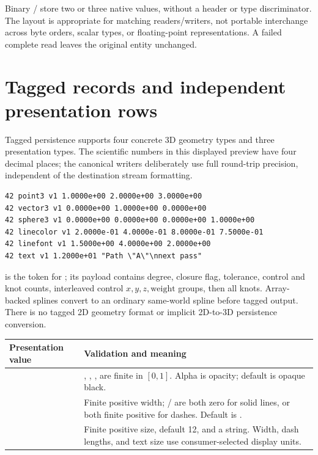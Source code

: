 Binary / store two or three native  values,
without a header or type discriminator. The layout is appropriate for matching
readers/writers, not portable interchange across byte orders, scalar types, or
floating-point representations. A failed complete read leaves the original
entity unchanged.

\section{Tagged records and independent presentation rows}
Tagged persistence supports four concrete 3D geometry types and three
presentation types. The scientific numbers in this displayed preview have
four decimal places; the canonical writers deliberately use full round-trip
 precision, independent of the destination stream formatting.

\begin{lstlisting}[style=plain]
42 point3 v1 1.0000e+00 2.0000e+00 3.0000e+00
42 vector3 v1 0.0000e+00 1.0000e+00 0.0000e+00
42 sphere3 v1 0.0000e+00 0.0000e+00 0.0000e+00 1.0000e+00
42 linecolor v1 2.0000e-01 4.0000e-01 8.0000e-01 7.5000e-01
42 linefont v1 1.5000e+00 4.0000e+00 2.0000e+00
42 text v1 1.2000e+01 "Path \"A\"\nnext pass"
\end{lstlisting}
 is the token for ; its payload contains
degree, closure flag, tolerance, control and knot counts, interleaved control
$x,y,z,\text{weight}$ groups, then all knots. Array-backed splines convert to
an ordinary same-world spline before tagged output. There is no tagged 2D
geometry format or implicit 2D-to-3D persistence conversion.

\begin{tabularx}{\linewidth}{@{}lY@{}}
\toprule
Presentation value & Validation and meaning\\
\midrule
{} & , , ,  are
finite in $[0,1]$. Alpha is opacity; default is opaque black.\\
 & Finite positive width; / are both
zero for solid lines, or both finite positive for dashes. Default is
.\\
 & Finite positive size, default 12, and a string.
Width, dash lengths, and text size use consumer-selected display units.\\
\bottomrule
\end{tabularx}

